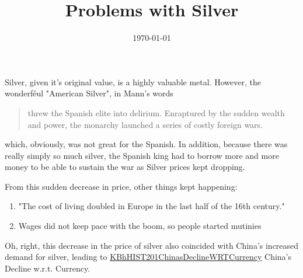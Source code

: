 \documentclass[letterpaper]{article}
\date{\today}
\title{Problems with Silver}
\renewcommand\maketitle{}
\begin{document}
\maketitle
Silver, given it's original value, is a highly valuable metal. However,
the wonderféul "American Silver", in Mann's words

\begin{quote}
threw the Spanish elite into delirium. Enraptured by the sudden wealth
and power, the monarchy launched a series of costly foreign wars.
\end{quote}

which, obviously, was not great for the Spanish. In addition, because
there was really simply so much silver, the Spanish king had to borrow
more and more money to be able to sustain the war as Silver prices kept
dropping.

From this sudden decrease in price, other things kept happening:

\begin{enumerate}
\item "The cost of living doubled in Europe in the last half of the 16th
century."
\item Wages did not keep pace with the boom, so people started mutinies
\end{enumerate}

Oh, right, this decrease in the price of silver also coincided with
China's increased demand for silver, leading to
\href{KBhHIST201ChinasDeclineWRTCurrency.org}{KBhHIST201ChinasDeclineWRTCurrency}
China's Decline w.r.t. Currency.
\end{document}
